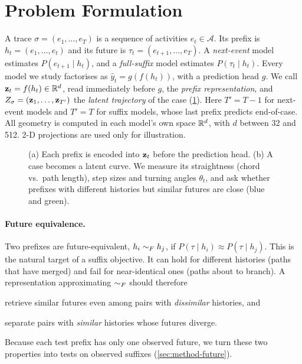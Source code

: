 \section{Problem Formulation}\label{sec:background}

A trace $\sigma=(e_1,\dots,e_T)$ is a sequence of activities $e_t\in\mathcal{A}$.
Its prefix is $h_t=(e_1,\dots,e_t)$ and its future is
$\tau_t=(e_{t+1},\dots,e_T)$. A \emph{next-event} model estimates
$P(e_{t+1}\mid h_t)$, and a \emph{full-suffix} model estimates $P(\tau_t\mid h_t)$.
Every model we study factorises as $\hat y_t=g(f(h_t))$, with a prediction
head $g$. We call $\mathbf{z}_t=f(h_t)\in\mathbb{R}^d$, read immediately before $g$, the
\emph{prefix representation}, and $Z_\sigma=(\mathbf{z}_1,\dots,\mathbf{z}_{T'})$ the
\emph{latent trajectory} of the case (\cref{fig:concept}). Here $T'=T-1$ for
next-event models and $T'=T$ for suffix models, whose last prefix predicts
end-of-case. All geometry is computed in each model's own space $\mathbb{R}^d$, with
$d$ between 32 and 512. 2-D projections are used only for illustration.

\begin{figure}[t]
\centering
\resizebox{\linewidth}{!}{}
\caption{(a) Each prefix is encoded into $\mathbf{z}_t$ before the prediction head.
(b) A case becomes a latent curve. We measure its straightness (chord
vs.\ path length), step sizes and turning angles $\theta_t$, and ask whether
prefixes with different histories but similar futures are close (blue and
green).}
\label{fig:concept}
\end{figure}

\paragraph{Future equivalence.}
Two prefixes are future-equivalent, $h_i\sim_{F} h_j$, if
$P(\tau\mid h_i)\approx P(\tau\mid h_j)$. This is the natural target of a suffix
objective. It can hold for different histories (paths that have merged) and
fail for near-identical ones (paths about to branch). A representation
approximating $\sim_{F}$ should therefore
\begin{enumerate*}[label=(\roman*)]
\item retrieve similar futures even among pairs with \emph{dissimilar}
      histories, and
\item separate pairs with \emph{similar} histories whose futures diverge.
\end{enumerate*}
Because each test prefix has only one observed future, we turn these two
properties into tests on observed suffixes (\cref{sec:method-future}).

